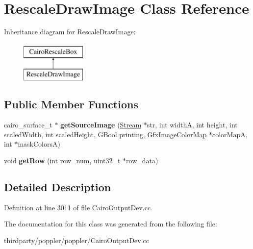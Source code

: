 \hypertarget{class_rescale_draw_image}{}\section{Rescale\+Draw\+Image Class Reference}
\label{class_rescale_draw_image}
Inheritance diagram for Rescale\+Draw\+Image\+:\begin{figure}[H]
\begin{center}
\leavevmode
\includegraphics[height=2.000000cm]{class_rescale_draw_image}
\end{center}
\end{figure}
\subsection*{Public Member Functions}
\begin{DoxyCompactItemize}
\item 
\mbox{\label{class_rescale_draw_image_ac5baf077b9664b975c5898ade18daf84}} 
cairo\+\_\+surface\+\_\+t $\ast$ {\bfseries get\+Source\+Image} (\hyperlink{class_stream}{Stream} $\ast$str, int widthA, int height, int scaled\+Width, int scaled\+Height, G\+Bool printing, \hyperlink{class_gfx_image_color_map}{Gfx\+Image\+Color\+Map} $\ast$color\+MapA, int $\ast$mask\+ColorsA)
\item 
\mbox{\label{class_rescale_draw_image_a26a69d44acb0f018e32960735ae23b10}} 
void {\bfseries get\+Row} (int row\+\_\+num, uint32\+\_\+t $\ast$row\+\_\+data)
\end{DoxyCompactItemize}


\subsection{Detailed Description}


Definition at line 3011 of file Cairo\+Output\+Dev.\+cc.



The documentation for this class was generated from the following file\+:\begin{DoxyCompactItemize}
\item 
thirdparty/poppler/poppler/Cairo\+Output\+Dev.\+cc\end{DoxyCompactItemize}
